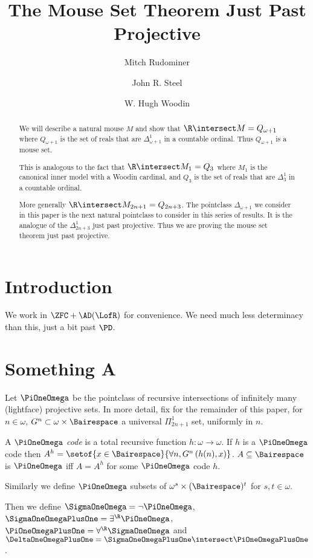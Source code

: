 \documentclass[oneside,12pt]{amsart}
\begin{document}
\title{The Mouse Set Theorem Just Past Projective}
\author{Mitch Rudominer}
\author{John R. Steel}
\author{W. Hugh Woodin}



\begin{abstract}
We will describe a natural mouse $M$ and show that $\R\intersect M = Q_{\omega+1}$
where $Q_{\omega+1}$  is the set of reals that are
$\Delta^1_{\omega+1}$ in a countable ordinal. Thus $Q_{\omega+1}$
is a mouse set.

This is analogous to the fact that $\R\intersect M_1 = Q_3$ where $M_1$ is the
canonical inner model with a Woodin cardinal, and $Q_3$ is the set of reals
that are $\Delta^1_3$ in a countable ordinal.

More generally $\R\intersect M_{2n+1} = Q_{2n+3}$.
The pointclass $\Delta_{\omega+1}$  we consider in this paper is the next natural
pointclass to consider in this series of results. It is the analogue of
the $\Delta^1_{2n+3}$ just past projective. Thus we are proving the mouse
set theorem just past projective.
\end{abstract}

\maketitle

\tableofcontents

\section{Introduction}
\label{section:intro}

We work in $\ZFC+\AD(\LofR)$ for convenience. We need much less determinacy
than this, just a bit past $\PD$.

\section{Something A}
\label{section:somethinga}

\begin{definition}
Let $\PiOneOmega$ be the pointclass of recursive intersections of infinitely many (lightface) projective sets.
In more detail, fix for the remainder of this paper, for $n\in\omega$, $G^n\subset\omega\times\Bairespace$
a universal $\Pi^1_{2n+1}$ set, uniformly in $n$.

A $\PiOneOmega$ \emph{code} is a total recursive function $h:\omega\to\omega$. If $h$ is a $\PiOneOmega$ code then
$A^h=\setof{x\in\Bairespace}{\forall n, G^n\left(h(n),x\right)}$. $A\subseteq\Bairespace$ is $\PiOneOmega$ iff
$A=A^h$ for some $\PiOneOmega$ code $h$.

Similarly we define $\PiOneOmega$ subsets of $\omega^s\times(\Bairespace)^t$ for $s,t\in\omega$.

Then we define $\SigmaOneOmega = \neg\PiOneOmega$, $\SigmaOneOmegaPlusOne=\exists^{\R}\PiOneOmega$,
$\PiOneOmegaPlusOne = \forall^{\R}\SigmaOneOmega$ and
$\DeltaOneOmegaPlusOne = \SigmaOneOmegaPlusOne \intersect \PiOneOmegaPlusOne$.
\end{definition}
\end{document}
